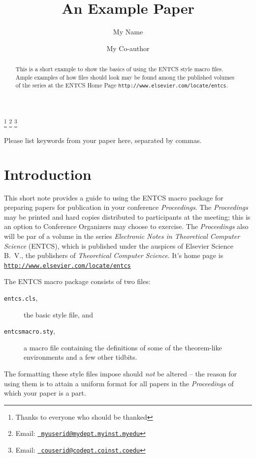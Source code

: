 \documentclass{entcs} \usepackage{entcsmacro}
\begin{document}
\begin{frontmatter}
  \title{An Example Paper} \author{My
    Name}
  \address{My Department\\ My University\\
    My City, My Country} \author{My Co-author}
  \address{My Co-author's Department\\My Co-author's University\\
    My Co-author's City, My Co-author's Country} \thanks[ALL]{Thanks
    to everyone who should be thanked} \thanks[myemail]{Email:
    \href{mailto:myuserid@mydept.myinst.myedu} {\texttt{\normalshape
        myuserid@mydept.myinst.myedu}}} \thanks[coemail]{Email:
    \href{mailto:couserid@codept.coinst.coedu} {\texttt{\normalshape
        couserid@codept.coinst.coedu}}}
\begin{abstract} 
  This is a short example to show the basics of using the ENTCS style
  macro files.  Ample examples of how files should look may be found
  among the published volumes of the series at the ENTCS Home Page
  \texttt{http://www.elsevier.com/locate/entcs}.
\end{abstract}
\begin{keyword}
  Please list keywords from your paper here, separated by commas.
\end{keyword}
\end{frontmatter}
\section{Introduction}\label{intro}
This short note provides a guide to using the ENTCS macro package for
preparing papers for publication in your conference
\emph{Proceedings}. The \emph{Proceedings} may be printed and hard
copies distributed to participants at the meeting; this is an option
to Conference Organizers may choose to exercise.  The
\emph{Proceedings} also will be par of a volume in the series
\emph{Electronic Notes in Theoretical Computer Science} (ENTCS), which
is published under the auspices of Elsevier Science B.~V., the
publishers of \emph{Theoretical Computer Science}. It's home page is
\href{http://www.elsevier.nl/locate/entcs}
{\texttt{http://www.elsevier.com/locate/entcs}}

The ENTCS macro package consists of two files:
\begin{description}
\item[\texttt{entcs.cls},] the basic style file, and
\item[\texttt{entcsmacro.sty},] a macro file containing the
  definitions of some of the theorem-like environments and a few other
  tidbits.
\end{description}
The formatting these style files impose should \emph{not} be altered
-- the reason for using them is to attain a uniform format for all
papers in the \emph{Proceedings} of which your paper is a part.
\end{document}
